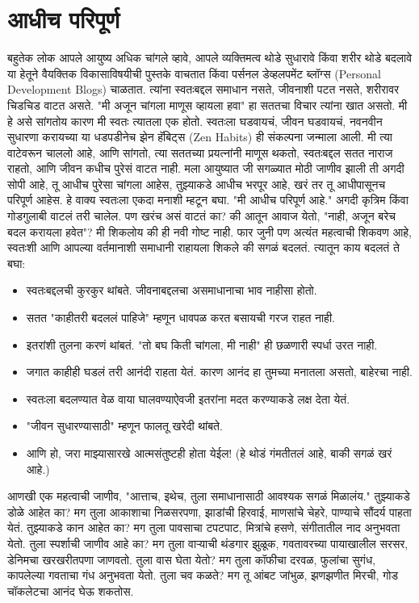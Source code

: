  \chapter{आधीच परिपूर्ण}
बहुतेक लोक आपले आयुष्य अधिक चांगले व्हावे, आपले व्यक्तिमत्व थोडे सुधारावे किंवा शरीर थोडे बदलावे या हेतूने वैयक्तिक विकासाविषयीची पुस्तके वाचतात किंवा पर्सनल डेव्हलपमेंट ब्लॉग्स (Personal Development Blogs) चाळतात. त्यांना स्वतःबद्दल समाधान नसते, जीवनाशी पटत नसते, शरीरावर चिडचिड वाटत असते. "मी अजून चांगला माणूस व्हायला हवा" हा सततचा विचार त्यांना खात असतो.
मी हे असे सांगतोय कारण मी स्वतः त्यातला एक होतो.
स्वतःला घडवायचं, जीवन घडवायचं, नवनवीन सुधारणा करायच्या या धडपडीनेच झेन हॅबिट्स (Zen Habits) ही संकल्पना जन्माला आली. मी त्या वाटेवरून चाललो आहे, आणि सांगतो,  त्या सततच्या प्रयत्नांनी माणूस थकतो, स्वतःबद्दल सतत नाराज राहतो, आणि जीवन कधीच पुरेसं वाटत नाही.
मला आयुष्यात जी सगळ्यात मोठी जाणीव झाली ती अगदी सोपी आहे,  तू आधीच पुरेसा चांगला आहेस, तुझ्याकडे आधीच भरपूर आहे, खरं तर तू आधीपासूनच परिपूर्ण आहेस.
हे वाक्य स्वतःला एकदा मनाशी म्हटून बघा. "मी आधीच परिपूर्ण आहे." अगदी कृत्रिम किंवा गोडगुलाबी वाटलं तरी चालेल. पण खरंच असं वाटतं का? की आतून आवाज येतो,  "नाही, अजून बरेच बदल करायला हवेत"?
मी शिकलोय की ही नवी गोष्ट नाही. फार जुनी पण अत्यंत महत्वाची शिकवण आहे,  स्वतःशी आणि आपल्या वर्तमानाशी समाधानी राहायला शिकले की सगळं बदलतं.
त्यातून काय बदलतं ते बघा:
\begin{itemize}
 \item स्वतःबद्दलची कुरकुर थांबते. जीवनाबद्दलचा असमाधानाचा भाव नाहीसा होतो.
 \item सतत "काहीतरी बदललं पाहिजे" म्हणून धावपळ करत बसायची गरज राहत नाही.
 \item इतरांशी तुलना करणं थांबतं. "तो बघ किती चांगला, मी नाही" ही छळणारी स्पर्धा उरत नाही.
 \item जगात काहीही घडलं तरी आनंदी राहता येतं. कारण आनंद हा तुमच्या मनातला असतो, बाहेरचा नाही.
 \item स्वतःला बदलण्यात वेळ वाया घालवण्याऐवजी इतरांना मदत करण्याकडे लक्ष देता येतं.
 \item "जीवन सुधारण्यासाठी" म्हणून फालतू खरेदी थांबते.
 \item आणि हो, जरा माझ्यासारखे आत्मसंतुष्टही होता येईल! (हे थोडं गंमतीतलं आहे, बाकी सगळं खरं आहे.)
 \end{itemize}
आणखी एक महत्वाची जाणीव,  "आत्ताच, इथेच, तुला समाधानासाठी आवश्यक सगळं मिळालंय."
तुझ्याकडे डोळे आहेत का? मग तुला आकाशाचा निळसरपणा, झाडांची हिरवाई, माणसांचे चेहरे, पाण्याचे सौंदर्य पाहता येतं. तुझ्याकडे कान आहेत का? मग तुला पावसाचा टपटपाट, मित्रांचे हसणे, संगीतातील नाद अनुभवता येतो. तुला स्पर्शाची जाणीव आहे का? मग तुला वाऱ्याची थंडगार झुळूक, गवतावरच्या पायाखालील सरसर, डेनिमचा खरखरीतपणा जाणवतो. तुला वास घेता येतो? मग तुला कॉफीचा दरवळ, फुलांचा सुगंध, कापलेल्या गवताचा गंध अनुभवता येतो. तुला चव कळते? मग तू आंबट जांभुळ, झणझणीत मिरची, गोड चॉकलेटचा आनंद घेऊ शकतोस.
